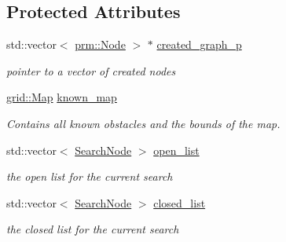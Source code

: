 \subsection*{Protected Attributes}
\begin{DoxyCompactItemize}
\item 
\mbox{\label{classhsearch_1_1HSearch_a92b4944c741acab45fc3c71661f1aa42}} 
std\+::vector$<$ \hyperlink{structprm_1_1Node}{prm\+::\+Node} $>$ $\ast$ \hyperlink{classhsearch_1_1HSearch_a92b4944c741acab45fc3c71661f1aa42}{created\+\_\+graph\+\_\+p}
\begin{DoxyCompactList}\small\item\em pointer to a vector of created nodes \end{DoxyCompactList}\item 
\mbox{\label{classhsearch_1_1HSearch_ad43c076b2d52f4e58dbf29efdb15d1b6}} 
\hyperlink{structgrid_1_1Map}{grid\+::\+Map} \hyperlink{classhsearch_1_1HSearch_ad43c076b2d52f4e58dbf29efdb15d1b6}{known\+\_\+map}
\begin{DoxyCompactList}\small\item\em Contains all known obstacles and the bounds of the map. \end{DoxyCompactList}\item 
\mbox{\label{classhsearch_1_1HSearch_a20e68d7726e57a42cb65427b7f9da89f}} 
std\+::vector$<$ \hyperlink{structhsearch_1_1SearchNode}{Search\+Node} $>$ \hyperlink{classhsearch_1_1HSearch_a20e68d7726e57a42cb65427b7f9da89f}{open\+\_\+list}
\begin{DoxyCompactList}\small\item\em the open list for the current search \end{DoxyCompactList}\item 
\mbox{\label{classhsearch_1_1HSearch_ae85581fef9d5887f154d2d3b9ea3a06e}} 
std\+::vector$<$ \hyperlink{structhsearch_1_1SearchNode}{Search\+Node} $>$ \hyperlink{classhsearch_1_1HSearch_ae85581fef9d5887f154d2d3b9ea3a06e}{closed\+\_\+list}
\begin{DoxyCompactList}\small\item\em the closed list for the current search \end{DoxyCompactList}\item 
\mbox{\label{classhsearch_1_1HSearch_a3188c5cda32b79ace51327a4ede85f33}} 

\end{DoxyCompactItemize}
